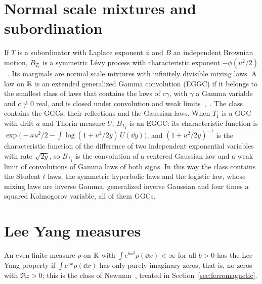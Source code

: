 \section{Normal scale mixtures and subordination}

If $T$ is a subordinator with Laplace exponent $\phi$ and $B$ an independent Brownian motion, $B_{T_t}$ is a symmetric L\'evy process with characteristic exponent $-\phi(u^2/2)$~\cite[Section~30]{sato1999}. Its marginals are normal scale mixtures with infinitely divisible mixing laws. A law on $\mathbb{R}$ is an extended generalized Gamma convolution (EGGC) if it belongs to the smallest class of laws that contains the laws of $c\gamma$, with $\gamma$ a Gamma variable and $c\neq0$ real, and is closed under convolution and weak limits~\cite{thorin1978},~\cite[Chapter 7]{bondesson1992}. The class contains the GGCs, their reflections and the Gaussian laws. When $T_1$ is a GGC with drift $a$ and Thorin measure $U$, $B_{T_1}$ is an EGGC: its characteristic function is $\exp\big(-au^2/2-\int\log(1+u^2/2y)\,U(\dd y)\big)$, and $(1+u^2/2y)^{-1}$ is the characteristic function of the difference of two independent exponential variables with rate $\sqrt{2y}$, so $B_{T_1}$ is the convolution of a centered Gaussian law and a weak limit of convolutions of Gamma laws of both signs. In this way the class contains the Student $t$ laws, the symmetric hyperbolic laws and the logistic law, whose mixing laws are inverse Gamma, generalized inverse Gaussian and four times a squared Kolmogorov variable, all of them GGCs.

\section{Lee Yang measures}

An even finite measure $\rho$ on $\mathbb{R}$ with $\int e^{bx^2}\rho(\dd x)<\infty$ for all $b>0$ has the Lee Yang property if $\int e^{zx}\rho(\dd x)$ has only purely imaginary zeros, that is, no zeros with $\Re z>0$; this is the class of Newman~\cite{newman1974}, treated in Section~\ref{sec:ferromagnetic}.
